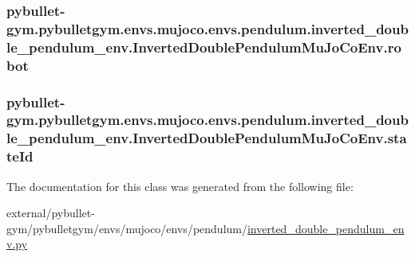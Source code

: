 \subsubsection[{\texorpdfstring{robot}{robot}}]{\setlength{\rightskip}{0pt plus 5cm}pybullet-\/gym.\+pybulletgym.\+envs.\+mujoco.\+envs.\+pendulum.\+inverted\+\_\+double\+\_\+pendulum\+\_\+env.\+Inverted\+Double\+Pendulum\+Mu\+Jo\+Co\+Env.\+robot}\hypertarget{classpybullet-gym_1_1pybulletgym_1_1envs_1_1mujoco_1_1envs_1_1pendulum_1_1inverted__double__pende0cbd4e243b5fa20c9b42e2de7690554_ad46699517de0746c947e08ae9976eb24}{}\label{classpybullet-gym_1_1pybulletgym_1_1envs_1_1mujoco_1_1envs_1_1pendulum_1_1inverted__double__pende0cbd4e243b5fa20c9b42e2de7690554_ad46699517de0746c947e08ae9976eb24}
\subsubsection[{\texorpdfstring{state\+Id}{stateId}}]{\setlength{\rightskip}{0pt plus 5cm}pybullet-\/gym.\+pybulletgym.\+envs.\+mujoco.\+envs.\+pendulum.\+inverted\+\_\+double\+\_\+pendulum\+\_\+env.\+Inverted\+Double\+Pendulum\+Mu\+Jo\+Co\+Env.\+state\+Id}\hypertarget{classpybullet-gym_1_1pybulletgym_1_1envs_1_1mujoco_1_1envs_1_1pendulum_1_1inverted__double__pende0cbd4e243b5fa20c9b42e2de7690554_a66cf4c06b656b0548032fea2a8f04fd7}{}\label{classpybullet-gym_1_1pybulletgym_1_1envs_1_1mujoco_1_1envs_1_1pendulum_1_1inverted__double__pende0cbd4e243b5fa20c9b42e2de7690554_a66cf4c06b656b0548032fea2a8f04fd7}


The documentation for this class was generated from the following file\+:\begin{DoxyCompactItemize}
\item 
external/pybullet-\/gym/pybulletgym/envs/mujoco/envs/pendulum/\hyperlink{mujoco_2envs_2pendulum_2inverted__double__pendulum__env_8py}{inverted\+\_\+double\+\_\+pendulum\+\_\+env.\+py}\end{DoxyCompactItemize}
